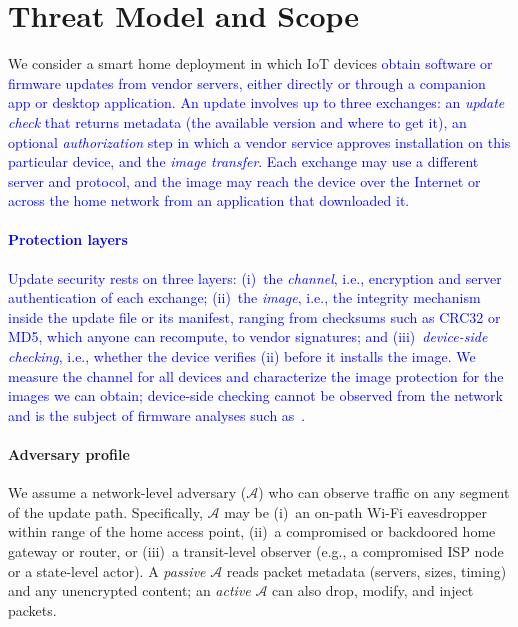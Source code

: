 \section{Threat Model and Scope}
\label{sec:threat}

We consider a smart home deployment in which IoT devices \textcolor{blue}{obtain software or firmware updates from vendor servers, either directly or through a companion app or desktop application.
An update involves up to three exchanges: an \emph{update check} that returns metadata (the available version and where to get it), an optional \emph{authorization} step in which a vendor service approves installation on this particular device, and the \emph{image transfer}.
Each exchange may use a different server and protocol, and the image may reach the device over the Internet or across the home network from an application that downloaded it.}

\paragraph{\textcolor{blue}{Protection layers}}
\textcolor{blue}{Update security rests on three layers:
(i)~the \emph{channel}, i.e., encryption and server authentication of each exchange;
(ii)~the \emph{image}, i.e., the integrity mechanism inside the update file or its manifest, ranging from checksums such as CRC32 or MD5, which anyone can recompute, to vendor signatures; and
(iii)~\emph{device-side checking}, i.e., whether the device verifies (ii) before it installs the image.
We measure the channel for all devices and characterize the image protection for the images we can obtain; device-side checking cannot be observed from the network and is the subject of firmware analyses such as~\cite{294541}.}

\paragraph{Adversary profile}
We assume a network-level adversary ($\mathcal{A}$) who can observe traffic on any segment of the update path.
Specifically, $\mathcal{A}$ may be (i)~an on-path Wi-Fi eavesdropper within range of the home access point, (ii)~a compromised or backdoored home gateway or router, or (iii)~a transit-level observer (e.g., a compromised ISP node or a state-level actor).
A \emph{passive} $\mathcal{A}$ reads packet metadata (servers, sizes, timing) and any unencrypted content; an \emph{active} $\mathcal{A}$ can also drop, modify, and inject packets.

